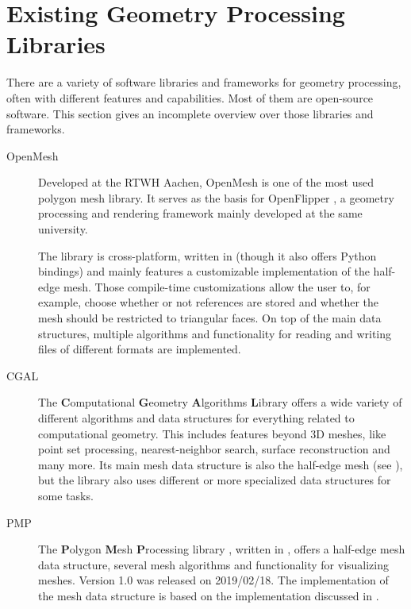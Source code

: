 \newpage
\section{Existing Geometry Processing Libraries}

There are a variety of software libraries and frameworks for geometry processing, often with different features and capabilities.
Most of them are open-source software.
This section gives an incomplete overview over those libraries and frameworks.

\begin{description}
  \item [OpenMesh] Developed at the RTWH Aachen, OpenMesh \cite{botsch2002openmesh,openmeshhomepage} is one of the most used polygon mesh library.
  It serves as the basis for OpenFlipper \cite{mobius2010openflipper, openflipperhomepage}, a geometry processing and rendering framework mainly developed at the same university.

  The library is cross-platform, written in \cpp (though it also offers Python bindings) and mainly features a customizable implementation of the half-edge mesh.
  Those compile-time customizations allow the user to, for example, choose whether or not  references are stored and whether the mesh should be restricted to triangular faces.
  On top of the main data structures, multiple algorithms and functionality for reading and writing files of different formats are implemented.

  \item [CGAL] The \textbf{C}omputational \textbf{G}eometry \textbf{A}lgorithms \textbf{L}ibrary \cite{cgalhomepage} offers a wide variety of different algorithms and data structures for everything related to computational geometry.
  This includes features beyond 3D meshes, like point set processing, nearest-neighbor search, surface reconstruction and many more.
  Its main mesh data structure is also the half-edge mesh (see \cite{cgal:k-hds-19a, cgal:bsmf-sm-19a}), but the library also uses different or more specialized data structures for some tasks.

  \item [PMP] The \textbf{P}olygon \textbf{M}esh \textbf{P}rocessing library \cite{pmp-library}, written in \cpp, offers a half-edge mesh data structure, several mesh algorithms and functionality for visualizing meshes.
  Version 1.0 was released on 2019/02/18.
  The implementation of the mesh data structure is based on the  implementation discussed in \cite{sieger2011design}.


\end{description}
